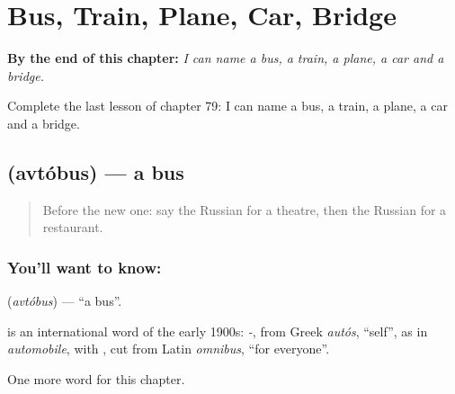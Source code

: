 
\chapter{Bus, Train, Plane, Car, Bridge}
\label{ch:ru-bus-train-plane-car-bridge}

\begin{chapteropening}
\textbf{By the end of this chapter:} \emph{I can name a bus, a train, a plane, a car and a bridge.}

Complete the last lesson of chapter 79: I can name a bus, a train, a plane, a car and a bridge.
\end{chapteropening}

\section[\texorpdfstring{\ru{автобус} (avtóbus)}{автобус (avtóbus)}]{ (avtóbus) — a bus}

\label{lesson:RU-C79-bus}



\begin{quote}
Before the new one: say the Russian for a theatre, then the Russian for a restaurant.
\end{quote}

\subsection*{You'll want to know: }
\textbf{} (\emph{avtóbus}) — \textquotedblleft{}a bus\textquotedblright{}.

\begin{cousinweb}
\textbf{} is an international word of the early 1900s: \emph{-}, from Greek \emph{autós}, \textquotedblleft{}self\textquotedblright{}, as in \emph{automobile}, with \emph{}, cut from Latin \emph{omnibus}, \textquotedblleft{}for everyone\textquotedblright{}.
\end{cousinweb}

\begin{grammarlens}[title={What you've built}]
One more word for this chapter.
\end{grammarlens}

